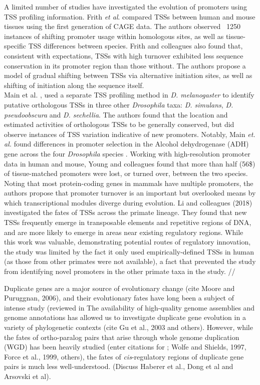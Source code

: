 \documentclass[nogrid]{MBE}%
\begin{document}
A limited number of studies have investigated the evolution of promoters using TSS profiling information. Frith \textit{et al}. \citep{Frith:2006bb} compared TSSs between human and mouse tissues using the first generation of CAGE data. The authors observed ~1250 instances of shifting promoter usage within homologous sites, as well as tissue-specific TSS differences between species. Frith and colleagues also found that, consistent with expectations, TSSs with high turnover exhibited less sequence conservation in its promoter region than those without. The authors propose a model of gradual shifting between TSSs via alternative initiation sites, as well as shifting of initiation along the sequence itself. \\

Main et al. \citep{Main:2013dg}, used a separate TSS profiling method in \textit{D. melanogaster} to identify putative orthologous TSSs in three other \textit{Drosophila} taxa: \textit{D. simulans}, \textit{D. pseudoobscura} and \textit{D. sechellia}. The authors found that the location and estimated activities of orthologous TSSs to be generally conserved, but did observe instances of TSS variation indicative of new promoters. Notably, Main \textit{et. al.} found differences in promoter selection in the Alcohol dehydrogenase (ADH) gene across the four \textit{Drosophila} species \citep{Main:2013dg}. Working with high-resolution promoter data in human and mouse, Young and colleagues \citep{Young:2015xx} found that more than half (56\$) of tissue-matched promoters were lost, or turned over, between the two species. Noting that most protein-coding genes in mammals \citep{FANTOMConsortiumandtheRIKENPMIandCLSTDGT:2014hz} have multiple promoters, the authors propose that promoter turnover is an important but overlooked means by which transcriptional modules diverge during evolution. Li and colleagues (2018) investigated the fates of TSSs across  the primate lineage. They found that new TSSs frequently emerge in transposable elements and repetitive regions of DNA, and are more likely to emerge in areas near existing regulatory regions. While this work was valuable, demonstrating potential routes of regulatory innovation, the study was limited by the fact it only used empirically-defined TSSs in human (as those from other primates were not available), a fact that prevented the study from identifying novel promoters in the other primate taxa in the study. // 

Duplicate genes are a major source of evolutionary change (cite \citep{Ohno:1970wm} Moore and Puruggnan, 2006), and their evolutionary fates have long been a subject of intense study (reviewed in  The availability of high-quality genome assemblies and genome annotations has allowed us to investigate duplicate gene evolution in a variety of phylogenetic contexts (cite Gu et al., 2003 and others). However, while the fates of ortho-paralog pairs that arise through whole genome duplication (WGD) has been heavily studied (enter citations for \citep{Ohno:1970wm}; Wolfe and Shields, 1997, Force et al., 1999, others), the fates of \textit{cis}-regulatory regions of duplicate gene pairs is much less well-understood. (Discuss Haberer et al., Dong et al and Arsovski et al). 
\end{document}
